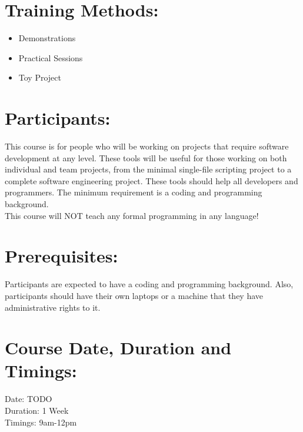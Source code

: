 \documentclass[a4paper,11pt]{article}
\begin{document}
\section{Training Methods:}
\begin{itemize}
		\item Demonstrations
		\item Practical Sessions
		\item Toy Project
\end{itemize}

\section{Participants:}
This course is for people who will be working on projects that require software development at any level. These tools will be useful for those working on both individual and team projects, from the minimal single-{f}ile scripting project to a complete software engineering project. These tools should help all developers and programmers. The minimum requirement is a coding and programming background.\\
This course will NOT teach any formal programming in any language!

\section{Prerequisites:}
Participants are expected to have a coding and programming background. Also, participants should have their own laptops or a machine that they have administrative rights to it.

\section{Course Date, Duration and Timings:}
Date: TODO\\
Duration: 1 Week\\
Timings: 9am-12pm
\end{document}
